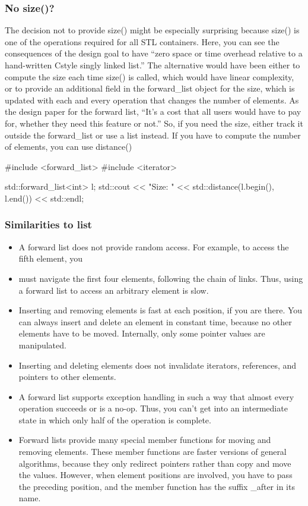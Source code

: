 \documentclass{report}
\begin{document}
   \subsubsection{No size()?}
   \bigbreak \noindent \bigbreak \noindent 
   The decision not to provide size() might be especially surprising because size() is one of the operations required for all STL containers. Here, you can see the consequences of the design goal to have “zero space or time overhead relative to a hand-written Cstyle singly linked list.” The alternative would have been either to compute the size each time size() is called, which would have linear complexity, or to provide an additional field in the forward\_list object for the size, which is updated with each and every operation that changes the number of elements. As the design paper for the forward list, “It’s a cost that all users would have to pay for, whether they need this feature or not.” So, if you need the size, either track it outside the forward\_list or use a list instead.
   \bigbreak \noindent 
   If you have to compute the number of elements, you can use distance()
   \bigbreak \noindent 
   \begin{cppcode}
   #include <forward_list>
   #include <iterator>

   std::forward_list<int> l;
   std::cout << "Size: " << std::distance(l.begin(), l.end()) << std::endl;
   \end{cppcode}

   \bigbreak \noindent 
   \subsubsection{Similarities to list}
   \bigbreak \noindent \bigbreak \noindent 
   \begin{itemize}
       \item A forward list does not provide random access. For example, to access the fifth element, you
       \item must navigate the first four elements, following the chain of links. Thus, using a forward list to access an arbitrary element is slow.
       \item Inserting and removing elements is fast at each position, if you are there. You can always insert and delete an element in constant time, because no other elements have to be moved. Internally, only some pointer values are manipulated.
       \item Inserting and deleting elements does not invalidate iterators, references, and pointers to other elements.
       \item A forward list supports exception handling in such a way that almost every operation succeeds or is a no-op. Thus, you can’t get into an intermediate state in which only half of the operation is complete.
       \item Forward lists provide many special member functions for moving and removing elements. These member functions are faster versions of general algorithms, because they only redirect pointers rather than copy and move the values. However, when element positions are involved, you have to pass the preceding position, and the member function has the suffix \_after in its name.
   \end{itemize}
\end{document}
